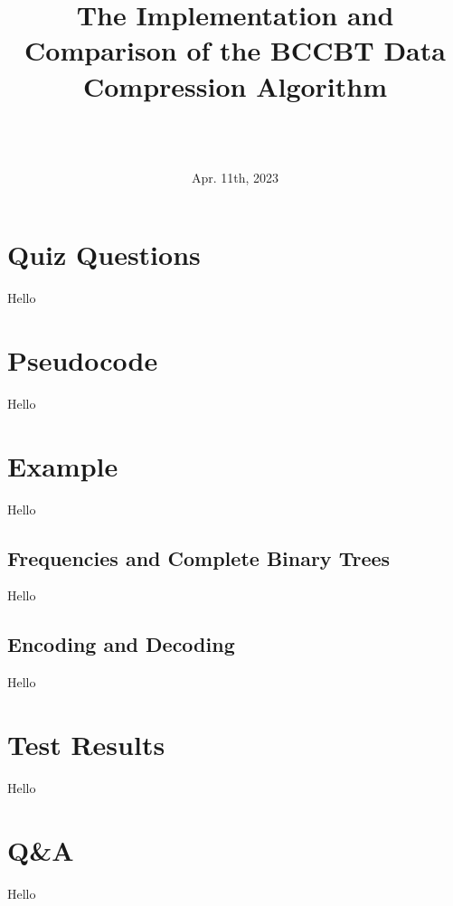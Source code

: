\documentclass{beamer}
\title[CPSC 530]
{The Implementation and Comparison of the BCCBT Data Compression Algorithm}
\author[Group 17]
{
\Aiden \\ \Noah \\ \Ty
}
\date{Apr. 11th, 2023}
\begin{document}
\begingroup
{}
\frame{\titlepage}
\endgroup

\begin{frame}
\tableofcontents
\end{frame}

\section{Quiz Questions}
\begin{frame}
Hello
\end{frame}


\section{Pseudocode}
\begin{frame}
Hello
\end{frame}

\section{Example}
\begin{frame}
Hello
\end{frame}

\subsection{Frequencies and Complete Binary Trees}
\begin{frame}
Hello
\end{frame}

\subsection{Encoding and Decoding}
\begin{frame}
Hello
\end{frame}

\section{Test Results}
\begin{frame}
Hello
\end{frame}

\section{Q\&A}
\begin{frame}
Hello
\end{frame}
\end{document}
